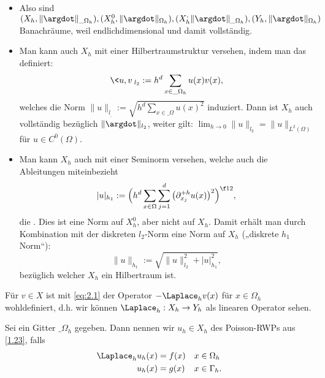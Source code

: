 \begin{nt*}[Nebenbemerkungen]
	\begin{itemize}
		\item
			Also sind $(X_h, \|\argdot\|_{\_\Omega_h}), (X_h^0, \|\argdot\|_{\Omega_h}), (X_h^ , \|\argdot\|_{\_\Omega_h}), (Y_h, \|\argdot\|_{\Omega_h})$ Banachräume, weil endlichdimensional und damit vollständig.
		\item
			Man kann auch $X_h$ mit einer Hilbertraumstruktur versehen, indem man das  definiert:
			\[
				\<u,v\>_{l_2} := h^d \sum_{x\in\_\Omega_h} u(x) v(x),
			\]
			welches die Norm $\|u\|_{l_,} := \sqrt{h^d \sum_{x\in\_\Omega} u(x)^2}$ induziert.
			Dann ist $X_h$ auch vollständig bezüglich $\|\argdot\|_{l_2}$, weiter gilt: $\lim_{h\to 0} \|u\|_{l_2} = \|u\|_{L^2(\Omega)}$ für $u \in C^0(\Omega)$.
		\item
			Man kann $X_h$ auch mit einer Seminorm versehen, welche auch die Ableitungen miteinbezieht
			\[
				|u|_{h_1}
				:= \Big( h^d \sum_{x\in\Omega} \sum_{j=1}^d  \big(\partial_{x_j}^{+h} u(x)\big)^2 \Big)^{\f 12},
			\]
			die .
			Dies ist eine Norm auf $X_h^0$, aber nicht auf $X_h$.
			Damit erhält man durch Kombination mit der diskreten $l_2$-Norm eine Norm auf $X_h$ („diskrete $h_1$ Norm“):
			\[
				\|u\|_{h_1}
				:= \sqrt{\|u\|_{l_2}^2 + |u|_{h_1}^2},
			\]
			bezüglich welcher $X_h$ ein Hilbertraum ist.
	\end{itemize}
\end{nt*}

Für $v \in X$ ist mit \eqref{eq:2.1} der Operator $-\Laplace_h v(x)$ für $x \in \Omega_h$ wohldefiniert, d.h. wir können $\Laplace_h : X_h \to Y_h$ als linearen Operator sehen.

\begin{df} \label{2.7}
	Sei ein Gitter $\_\Omega_h$ gegeben.
	Dann nennen wir $u_h \in X_h$  des Poisson-RWPs aus \ref{1.23}, falls
	\begin{align} \label{eq:2.2}
		\Laplace_h u_h(x) &= f(x) && \text{$x \in \Omega_h$} \\
		u_h(x) &= g(x) && \text{$x\in \Gamma_h$}. \notag
	\end{align}
\end{df}

